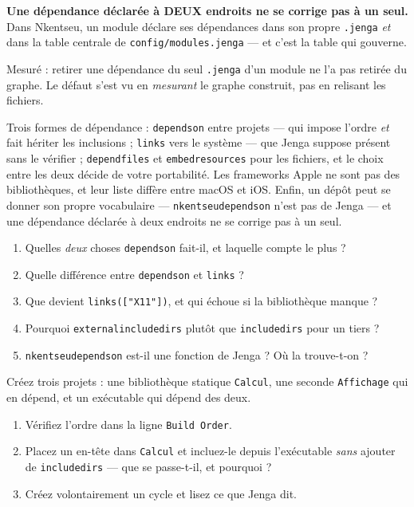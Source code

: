 \begin{nkpiege}
\textbf{Une dépendance déclarée à DEUX endroits ne se corrige pas à un seul.}
Dans Nkentseu, un module déclare ses dépendances dans son propre \texttt{.jenga}
\emph{et} dans la table centrale de \texttt{config/modules.jenga} --- et c'est la
table qui gouverne.

Mesuré : retirer une dépendance du seul \texttt{.jenga} d'un module ne l'a pas
retirée du graphe. Le défaut s'est vu en \emph{mesurant} le graphe construit, pas
en relisant les fichiers.
\end{nkpiege}

\begin{nkbilan}
Trois formes de dépendance : \texttt{dependson} entre projets --- qui impose
l'ordre \emph{et} fait hériter les inclusions ; \texttt{links} vers le système ---
que Jenga suppose présent sans le vérifier ; \texttt{dependfiles} et
\texttt{embedresources} pour les fichiers, et le choix entre les deux décide de
votre portabilité. Les frameworks Apple ne sont pas des bibliothèques, et leur
liste diffère entre macOS et iOS. Enfin, un dépôt peut se donner son propre
vocabulaire --- \texttt{nkentseudependson} n'est pas de Jenga --- et une
dépendance déclarée à deux endroits ne se corrige pas à un seul.
\end{nkbilan}

\begin{nkquestions}
\begin{enumerate}
\item Quelles \emph{deux} choses \texttt{dependson} fait-il, et laquelle compte
      le plus ?
\item Quelle différence entre \texttt{dependson} et \texttt{links} ?
\item Que devient \texttt{links(["X11"])}, et qui échoue si la bibliothèque
      manque ?
\item Pourquoi \texttt{externalincludedirs} plutôt que \texttt{includedirs} pour
      un tiers ?
\item \texttt{nkentseudependson} est-il une fonction de Jenga ? Où la trouve-t-on ?
\end{enumerate}
\end{nkquestions}

\begin{nkpratique}
Créez trois projets : une bibliothèque statique \texttt{Calcul}, une seconde
\texttt{Affichage} qui en dépend, et un exécutable qui dépend des deux.

\begin{enumerate}
\item Vérifiez l'ordre dans la ligne \texttt{Build Order}.
\item Placez un en-tête dans \texttt{Calcul} et incluez-le depuis l'exécutable
      \emph{sans} ajouter de \texttt{includedirs} --- que se passe-t-il, et
      pourquoi ?
\item Créez volontairement un cycle et lisez ce que Jenga dit.
\end{enumerate}
\end{nkpratique}

